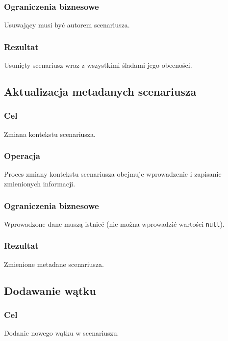 \subsubsection{Ograniczenia biznesowe}
Usuwający musi być autorem scenariusza.

\subsubsection{Rezultat}
Usunięty scenariusz wraz z wszystkimi śladami jego obecności.

\subsection{Aktualizacja metadanych scenariusza}

\subsubsection{Cel}
Zmiana kontekstu scenariusza.

\subsubsection{Operacja}
Proces zmiany kontekstu scenariusza obejmuje wprowadzenie i zapisanie zmienionych informacji.

\subsubsection{Ograniczenia biznesowe}
Wprowadzone dane muszą istnieć (nie można wprowadzić wartości \texttt{null}).

\subsubsection{Rezultat}
Zmienione metadane scenariusza.

\subsection{Dodawanie wątku}

\subsubsection{Cel}
Dodanie nowego wątku w scenariuszu.

